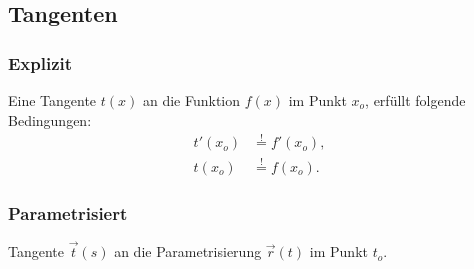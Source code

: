 \subsection{Tangenten}
    \subsubsection{Explizit}
        \vspace*{0.5em}
        Eine Tangente $t(x)$ an die Funktion $f(x)$ im Punkt $x_o$, erfüllt folgende Bedingungen:
        \begin{align*}
            t'(x_o) & \overset{!}{=} f'(x_o),\\
            t(x_o) & \overset{!}{=} f(x_o).
        \end{align*}
    \subsubsection{Parametrisiert}
        Tangente $\vec{t}(s)$  an die Parametrisierung $\vec{r}(t)$ im Punkt $t_o$.
